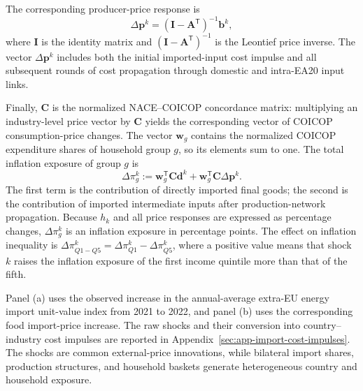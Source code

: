 The corresponding producer-price response is
\begin{equation}
\Delta\mathbf p^{k}=(\mathbf I-\mathbf A^{\mathsf T})^{-1}\mathbf b^{k},
\label{eq:leontief-import-price-response}
\end{equation}
where $\mathbf I$ is the identity matrix and $(\mathbf I-\mathbf A^{\mathsf T})^{-1}$ is the
Leontief price inverse. The vector $\Delta\mathbf p^k$ includes both the initial imported-input cost
impulse and all subsequent rounds of cost propagation through domestic and intra-EA20 input links.

Finally, $\mathbf C$ is the normalized NACE--COICOP concordance matrix: multiplying an
industry-level price vector by $\mathbf C$ yields the corresponding vector of COICOP
consumption-price changes. The vector $\mathbf w_g$ contains the normalized COICOP expenditure
shares of household group $g$, so its elements sum to one. The total inflation exposure of group
$g$ is
\begin{equation}
\Delta\pi_g^k
:=\mathbf w_g^{\mathsf T}\mathbf C\mathbf d^{k}
+\mathbf w_g^{\mathsf T}\mathbf C\Delta\mathbf p^{k}.
\label{eq:import-shock-household-effect}
\end{equation}
The first term is the contribution of directly imported final goods; the second is the contribution
of imported intermediate inputs after production-network propagation. Because $h_k$ and all price
responses are expressed as percentage changes, $\Delta\pi_g^k$ is an inflation exposure in percentage
points. The effect on inflation inequality is
$\Delta\pi_{Q1-Q5}^k=\Delta\pi_{Q1}^k-\Delta\pi_{Q5}^k$, where a positive value means that shock $k$ raises
the inflation exposure of the first income quintile more than that of the fifth.

Panel (a) uses the observed increase in the annual-average extra-EU energy import unit-value index
from 2021 to 2022, and panel (b) uses the corresponding food import-price increase. The raw shocks
and their conversion into country--industry cost impulses are reported in
Appendix~\ref{sec:app-import-cost-impulses}. The shocks are common external-price innovations, while
bilateral import shares, production structures, and household baskets generate heterogeneous
country and household exposure.

\begingroup
\renewcommand{\scriptsize}{\fontsize{8.5}{10}\selectfont}

\endgroup

